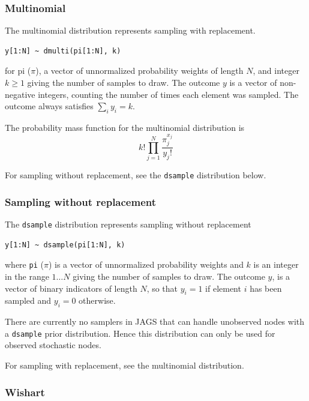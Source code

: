 \documentclass[11pt, a4paper, titlepage]{report}
\begin{document}
{\subsubsection{Multinomial}
\label{bugs:dmulti}

The multinomial distribution represents sampling with replacement. 
\begin{verbatim}
y[1:N] ~ dmulti(pi[1:N], k)
\end{verbatim}
for pi ($\pi$), a vector of unnormalized probability weights of length $N$,
and integer $k \geq 1$ giving the number of samples to draw. The outcome
$y$ is a vector of non-negative integers, counting the number of times
each element was sampled. The outcome always satisfies $\sum_i y_i = k$.

The probability mass function for the multinomial distribution is
\[
k! \prod_{j=1}^N
\frac{\textstyle \pi_j^{x_j}}{\textstyle y_j!}
\]

For sampling without replacement, see the \texttt{dsample}
distribution below.
      

\subsubsection{Sampling without replacement}
\label{bugs:dsample}

The \texttt{dsample} distribution represents sampling without replacement
\begin{verbatim}
y[1:N] ~ dsample(pi[1:N], k)
\end{verbatim}
where \texttt{pi} ($\pi$) is a vector of unnormalized probability
weights and $k$ is an integer in the range $1 \ldots N$ giving the
number of samples to draw. The outcome $y$, is a vector of binary
indicators of length $N$, so that $y_i = 1$ if element $i$ has been
sampled and $y_i = 0$ otherwise.

There are currently no samplers in JAGS that can handle unobserved
nodes with a \texttt{dsample} prior distribution. Hence this
distribution can only be used for observed stochastic nodes.

For sampling with replacement, see the multinomial distribution.

\subsubsection{Wishart}
\label{bugs:dwishart}

}
\end{document}
